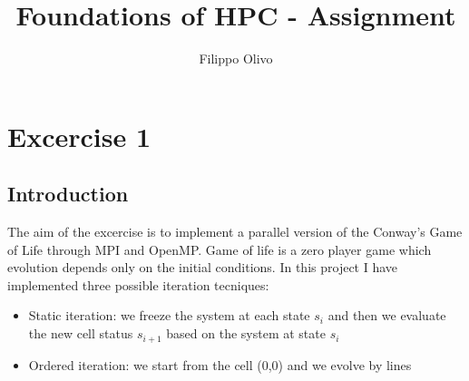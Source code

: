 \documentclass[
  letterpaper,
  DIV=11,
  numbers=noendperiod]{scrartcl}
\title{Foundations of HPC - Assignment}
\author{Filippo Olivo}
\date{}
\renewcommand*\contentsname{Table of contents}
\newcommand\contentsname{Table of contents}
\begin{document}
\maketitle
\ifdefined\Shaded\renewenvironment{Shaded}{\begin{tcolorbox}[interior hidden, boxrule=0pt, sharp corners, frame hidden, borderline west={3pt}{0pt}{shadecolor}, enhanced, breakable]}{\end{tcolorbox}}\fi

\renewcommand*\contentsname{Table of contents}
{
\hypersetup{linkcolor=}
\setcounter{tocdepth}{4}
\tableofcontents
}
\newpage

\noindent

\hypertarget{excercise-1}{%
\section{Excercise 1}\label{excercise-1}}

\hypertarget{introduction}{%
\subsection{Introduction}\label{introduction}}

The aim of the excercise is to implement a parallel version of the
Conway's Game of Life through MPI and OpenMP. Game of life is a zero
player game which evolution depends only on the initial conditions. In
this project I have implemented three possible iteration tecniques:

\begin{itemize}
\item
  Static iteration: we freeze the system at each state \(s_i\) and then
  we evaluate the new cell status \(s_{i+1}\) based on the system at
  state \(s_i\)
\item
  Ordered iteration: we start from the cell (0,0) and we evolve by lines
\end{itemize}
\end{document}
